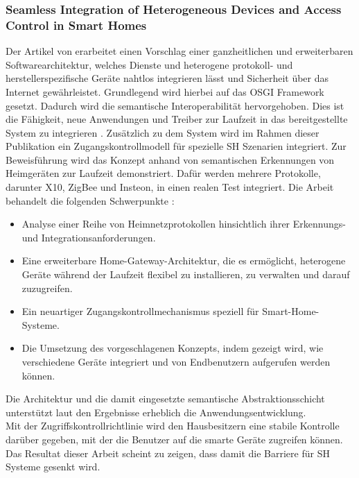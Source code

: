         \subsubsection*{Seamless Integration of Heterogeneous Devices and Access Control in Smart Homes}
            Der Artikel von \cite{Kim2012} erarbeitet einen Vorschlag einer ganzheitlichen und erweiterbaren 
            Softwarearchitektur, welches Dienste und heterogene protokoll- und herstellerspezifische Geräte 
            nahtlos integrieren lässt und Sicherheit über das Internet gewährleistet. Grundlegend wird hierbei auf das 
            \acs{OSGI} Framework gesetzt. Dadurch wird die semantische Interoperabilität hervorgehoben. Dies ist die Fähigkeit, 
            neue Anwendungen und Treiber zur Laufzeit in das bereitgestellte System zu integrieren \cite{Kim2012}. 
            Zusätzlich zu dem System wird im Rahmen dieser Publikation ein Zugangskontrollmodell für spezielle \acl{SH} 
            Szenarien integriert. Zur Beweisführung wird das Konzept anhand von semantischen Erkennungen von Heimgeräten zur 
            Laufzeit demonstriert. Dafür werden mehrere Protokolle, darunter X10, ZigBee und Insteon, in einen realen Test 
            integriert. Die Arbeit behandelt die folgenden Schwerpunkte \cite{Kim2012}:
            \begin{itemize}
                \item Analyse einer Reihe von Heimnetzprotokollen hinsichtlich ihrer Erkennungs- und Integrationsanforderungen.
                \item Eine erweiterbare Home-Gateway-Architektur, die es ermöglicht, heterogene Geräte während der Laufzeit flexibel zu installieren, zu verwalten und darauf zuzugreifen.
                \item Ein neuartiger Zugangskontrollmechanismus speziell für Smart-Home-Systeme.
                \item Die Umsetzung des vorgeschlagenen Konzepts, indem gezeigt wird, wie verschiedene Geräte integriert und von Endbenutzern aufgerufen werden können.
            \end{itemize}
            Die Architektur und die damit eingesetzte semantische Abstraktionsschicht unterstützt laut den Ergebnisse 
            erheblich die Anwendungsentwicklung. 
            \\
            Mit der Zugriffskontrollrichtlinie wird den Hausbesitzern eine stabile Kontrolle darüber gegeben, mit der 
            die Benutzer auf die smarte Geräte zugreifen können. Das Resultat dieser Arbeit scheint zu zeigen, dass damit 
            die Barriere für \acl{SH} Systeme gesenkt wird. 

